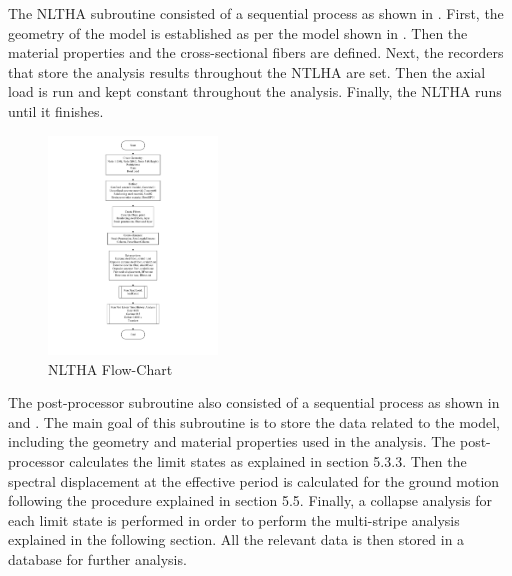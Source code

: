 The NLTHA subroutine consisted of a sequential process as shown in . First, the geometry of the model is established as per the model shown in . Then the material properties and the cross-sectional fibers are defined. Next, the recorders that store the analysis results throughout the NTLHA are set. Then the axial load is run and kept constant throughout the analysis. Finally, the NLTHA runs until it finishes.

\begin{figure}[htp]
	\centering
	\includegraphics[width=0.40\textwidth]{VAC Thesis 2.0/Chapter-5/figs/NLTHA_FlowCharts_01.pdf}
	\caption{NLTHA Flow-Chart}
	\label{fig:nltha_flowchart}
\end{figure}

The post-processor subroutine also consisted of a sequential process as shown in  and  . The main goal of this subroutine is to store the data related to the model, including the geometry and material properties used in the analysis. The post-processor calculates the limit states as explained in section 5.3.3. Then the spectral displacement at the effective period is calculated for the ground motion following the procedure explained in section 5.5. Finally, a collapse analysis for each limit state is performed in order to perform the multi-stripe analysis explained in the following section. All the relevant data is then stored in a database for further analysis.

